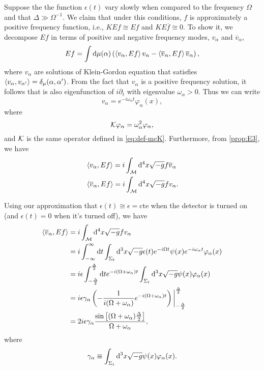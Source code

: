 Suppose the the function \(\epsilon(t)\) vary slowly when compared to the frequency \(\Omega\) and that \(\Delta\gg\Omega^{-1}\). We claim that under this conditions, \(f\) is approximately a positive frequency function, i.e., \(KEf\cong Ef\) and \(KE\overline{f}\cong 0\). To show it, we decompose \(Ef\) in terms of positive and negative frequency modes, \(v_{\alpha}\) and \(\overline{v}_\alpha\),
\begin{equation}
    Ef=\int \mathrm{d}\mu(\alpha)\left(\left\langle v_\alpha, Ef\right\rangle v_\alpha-\left\langle \overline{v}_\alpha, Ef\right\rangle\overline{v}_\alpha\right),
\end{equation}
where \(v_{\alpha}\) are solutions of Klein-Gordon equation that satisfies \(\left\langle v_{\alpha}, v_{\alpha'}\right\rangle=\delta_\mu(\alpha,\alpha')\). From the fact that \(v_\alpha\) is a positive frequency solution, it follows that is also eigenfunction of \(i\partial_t\) with eigenvalue \(\omega_\alpha>0\). Thus we can write
\begin{equation}
    v_{\alpha}=e^{-i\omega_\alpha t}\varphi_\alpha(x),
\end{equation}
where
\begin{equation}
    {\mathcal{K}}\varphi_{\alpha}=\omega_\alpha^2\varphi_\alpha,
\end{equation}
and \({\mathcal{K}}\) is the same operator defined in \cref{eq:def-mcK}. Furthermore, from \cref{prop:E3}, we have
\begin{subequations}
    \begin{align}
        &\left\langle v_\alpha, Ef\right\rangle=i\int_{\mathcal{M}}\mathrm{d}^4x\sqrt{-g}f\overline{v}_\alpha\\
        &\left\langle \overline{v}_\alpha, Ef\right\rangle=i\int_{\mathcal{M}}\mathrm{d}^4x\sqrt{-g}fv_{\alpha}.
    \end{align}
\end{subequations}

Using our approximation that \(\epsilon(t)\cong\epsilon=\text{cte}\) when the detector is turned on (and \(\epsilon(t)=0\) when it's turned off), we have
\begin{subequations}
    \begin{align}
        \left\langle \overline{v}_\alpha, Ef\right\rangle&=i\int_{{\mathcal{M}}}\mathrm{d}^4x\sqrt{-g}fv_\alpha\\
        &=i\int_{-\infty}^\infty\mathrm{d} t\int_{\Sigma_t}\mathrm{d}^3x\sqrt{-g}\epsilon(t)e^{-i\Omega t}\psi(x)e^{-i\omega_\alpha t}\varphi_\alpha(x)\\
        &=i\epsilon\int_{-\frac{\Delta}{2}}^{\frac{\Delta }{2}}\mathrm{d} te^{-i(\Omega+\omega_\alpha) t}\int_{\Sigma_t}\mathrm{d}^3x\sqrt{-g}\psi(x)\varphi_\alpha(x)\\
        &=i\epsilon\gamma_\alpha\left(-\frac{1}{i(\Omega+\omega_\alpha)}e^{-i(\Omega+\omega_\alpha)t}\right)\bigg\vert_{-\frac{\Delta}{2}}^{\frac{\Delta}{2}}\\
        &=2i\epsilon\gamma_\alpha\frac{\sin{\left[(\Omega+\omega_\alpha)\frac{\Delta}{2}\right]}}{\Omega+\omega_\alpha},
    \end{align}
\end{subequations}
where
\begin{equation}
    \gamma_\alpha\equiv\int_{\Sigma_t}\mathrm{d}^3x\sqrt{-g}\psi(x)\varphi_\alpha(x).
\end{equation}

